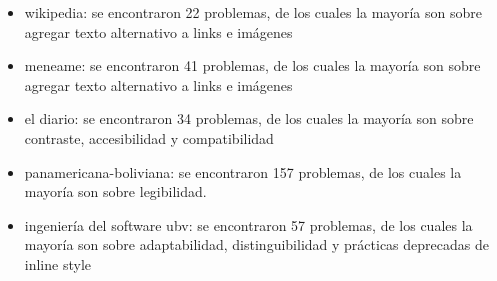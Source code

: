 \begin{itemize}
\item wikipedia: se encontraron 22 problemas, de los cuales la mayoría son sobre agregar texto alternativo a links e imágenes
\item meneame: se encontraron 41 problemas, de los cuales la mayoría son sobre agregar texto alternativo a links e imágenes
\item el diario: se encontraron 34 problemas, de los cuales la mayoría son sobre contraste, accesibilidad y compatibilidad
\item panamericana-boliviana: se encontraron 157 problemas, de los cuales la mayoría son sobre legibilidad.
\item ingeniería del software ubv: se encontraron 57 problemas, de los cuales la mayoría son sobre adaptabilidad, distinguibilidad y prácticas deprecadas de inline style
\end{itemize}
